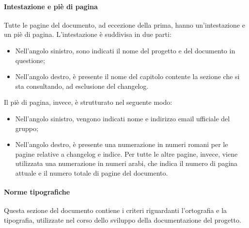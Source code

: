 			\paragraph{Intestazione e piè di pagina}
			Tutte le pagine del documento, ad eccezione della prima, hanno un'intestazione e un piè di pagina. L'intestazione è suddivisa in due parti:
			\begin{itemize}
				\item Nell'angolo sinistro, sono indicati il nome del progetto e del documento in questione;
				\item Nell'angolo destro, è presente il nome del capitolo contente la sezione che si sta consultando, ad esclusione del changelog.
			\end{itemize}
			Il piè di pagina, invece, è strutturato nel seguente modo:
			\begin{itemize}
				\item Nell'angolo sinistro, vengono indicati nome e indirizzo email ufficiale del gruppo;
				\item Nell'angolo destro, è presente una numerazione in numeri romani per le pagine relative a changelog e indice. Per tutte le altre pagine, invece, viene utilizzata una numerazione in numeri arabi, che indica il numero di pagina attuale e il numero totale di pagine del documento.
			\end{itemize} 

			\paragraph{Norme tipografiche}
			Questa sezione del documento contiene i criteri riguardanti l'ortografia e la tipografia, utilizzate nel corso dello sviluppo della documentazione del progetto.

